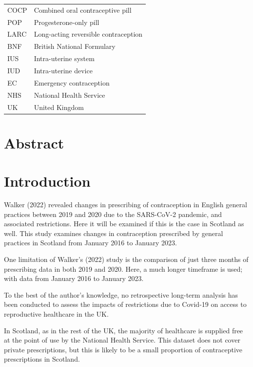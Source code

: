 \documentclass[
]{article}
\begin{document}
\begin{longtable}[]{@{}ll@{}}
\toprule\noalign{}
\endhead
\bottomrule\noalign{}
\endlastfoot
COCP & Combined oral contraceptive pill \\
POP & Progesterone-only pill \\
LARC & Long-acting reversible contraception \\
BNF & British National Formulary \\
IUS & Intra-uterine system \\
IUD & Intra-uterine device \\
EC & Emergency contraception \\
NHS & National Health Service \\
UK & United Kingdom \\
\end{longtable}

\hypertarget{abstract}{%
\section*{Abstract}\label{abstract}}

\hypertarget{introduction}{%
\section{Introduction}\label{introduction}}

Walker (2022) revealed changes in prescribing of contraception in
English general practices between 2019 and 2020 due to the SARS-CoV-2
pandemic, and associated restrictions. Here it will be examined if this
is the case in Scotland as well. This study examines changes in
contraception prescribed by general practices in Scotland from January
2016 to January 2023.

One limitation of Walker's (2022) study is the comparison of just three
months of prescribing data in both 2019 and 2020. Here, a much longer
timeframe is used; with data from January 2016 to January 2023.

To the best of the author's knowledge, no retrospective long-term
analysis has been conducted to assess the impacts of restrictions due to
Covid-19 on access to reproductive healthcare in the UK.

In Scotland, as in the rest of the UK, the majority of healthcare is
supplied free at the point of use by the National Health Service. This
dataset does not cover private prescriptions, but this is likely to be a
small proportion of contraceptive prescriptions in Scotland.
\end{document}

